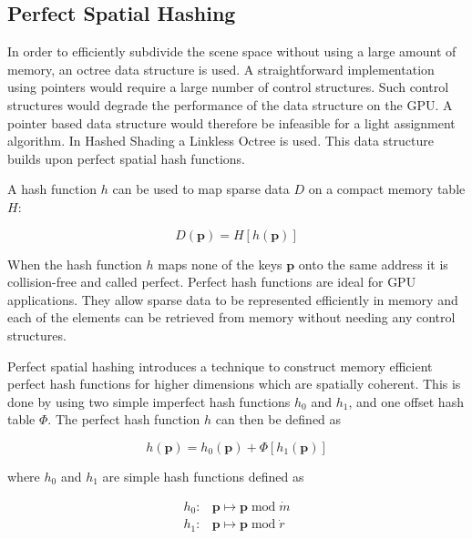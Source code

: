 \subsection{Perfect Spatial Hashing}

In order to efficiently subdivide the scene space without using a large amount
of memory, an octree data structure is used. A straightforward implementation
using pointers would require a large number of control structures. Such control
structures would degrade the performance of the data structure on the GPU\cite{Han:2011:RBD:1964179.1964184}.
A pointer based data structure would therefore be infeasible for a light assignment
algorithm. In Hashed Shading a Linkless Octree\cite{choi2009linkless} is used. This data structure
builds upon perfect spatial hash functions\cite{lefebvre2006perfect}.

A hash function $\mathit{h}$ can be used to map sparse data $D$ on a compact memory table $H$:

\begin{equation*}
  D\left(\mathbf{p}\right) = H\left[\mathit{h}\left(\mathbf{p}\right)\right]
\end{equation*}

\noindent When the hash function $\mathit{h}$ maps none of the keys $\mathbf{p}$ onto
the same address it is collision-free and called perfect. Perfect hash functions
are ideal for GPU applications. They allow sparse data to be represented efficiently in
memory and each of the elements can be retrieved from memory without needing any control
structures.

Perfect spatial hashing\cite{lefebvre2006perfect} introduces a technique
to construct memory efficient perfect hash functions for higher dimensions which are
spatially coherent. This is done by using two simple imperfect hash functions $\mathit{h}_0$
and $\mathit{h}_1$, and one offset hash table $\Phi$. The perfect hash function $\mathit{h}$
can then be defined as

\begin{equation*}
  \mathit{h}\left(\mathbf{p}\right) = \mathit{h}_0\left(\mathbf{p}\right) + \Phi\left[\mathit{h}_1\left(\mathbf{p}\right)\right]
\end{equation*}

\noindent where $\mathit{h}_0$ and $\mathit{h}_1$ are simple hash functions defined as

\begin{align*}
  \mathit{h}_0:& \mathbf{p} \mapsto \mathbf{p} \operatorname{mod} \dot{m} \\
  \mathit{h}_1:& \mathbf{p} \mapsto \mathbf{p} \operatorname{mod} \dot{r}
\end{align*}

